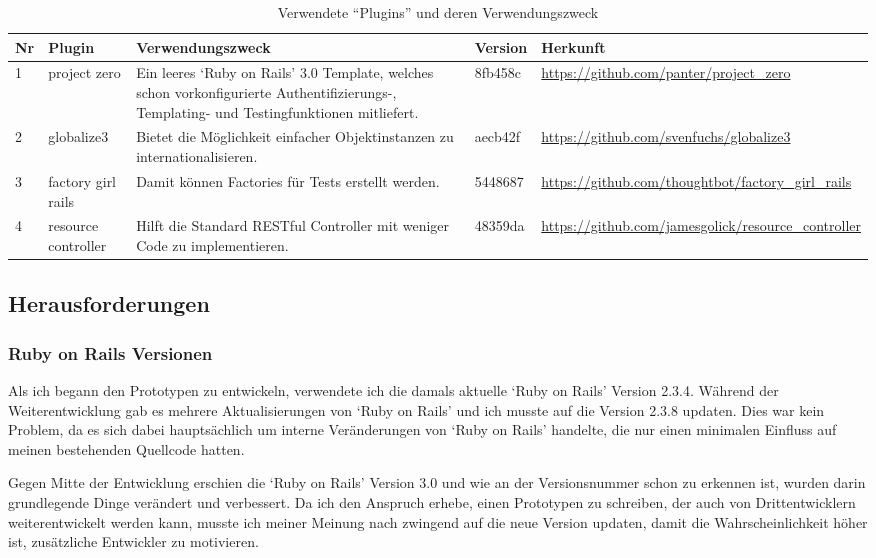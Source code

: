 \begin{table}[ht]
\begin{center}
    \begin{tabular}{llp{6cm}lp{3cm}}
        \toprule Nr & Plugin & Verwendungszweck & Version & Herkunft \\
        \midrule 1 & project zero & Ein leeres `Ruby on Rails' 3.0 Template, welches
                 schon vorkonfigurierte Authentifizierungs-, Templating- und Testingfunktionen
                 mitliefert. & 8fb458c & \url{https://github.com/panter/project_zero} \\
        \midrule 2 & globalize3 & Bietet die Möglichkeit einfacher Objektinstanzen
                 zu internationalisieren. & aecb42f & \url{https://github.com/svenfuchs/globalize3} \\
        \midrule 3 & factory girl rails & Damit können Factories \cite{factory} für Tests
                 erstellt werden. & 5448687 & \url{https://github.com/thoughtbot/factory_girl_rails} \\
        \midrule 4 & resource controller & Hilft die Standard RESTful \cite{restful} Controller mit weniger Code
                 zu implementieren. & 48359da & \url{https://github.com/jamesgolick/resource_controller} \\
        \bottomrule
    \end{tabular}
    \caption{Verwendete ``Plugins'' und deren Verwendungszweck}
    \label{tab:plugins}
\end{center}
\end{table}

\clearpage

\subsection{Herausforderungen}\label{chp:herausforderungen}
\subsubsection{Ruby on Rails Versionen}
Als ich begann den Prototypen zu entwickeln, verwendete ich die damals aktuelle
`Ruby on Rails' Version 2.3.4. Während der Weiterentwicklung gab es mehrere
Aktualisierungen von `Ruby on Rails' und ich musste auf die Version 2.3.8
updaten. Dies war kein Problem, da es sich dabei hauptsächlich um interne
Veränderungen von `Ruby on Rails' handelte, die nur einen minimalen Einfluss 
auf meinen bestehenden Quellcode hatten.

Gegen Mitte der Entwicklung erschien die `Ruby on Rails' Version 3.0 und wie
an der Versionsnummer schon zu erkennen ist, wurden darin grundlegende Dinge
verändert und verbessert. Da ich den Anspruch erhebe, einen Prototypen zu schreiben,
der auch von Drittentwicklern weiterentwickelt werden kann, musste ich meiner
Meinung nach zwingend auf die neue Version updaten, damit die Wahrscheinlichkeit
höher ist, zusätzliche Entwickler zu motivieren.

